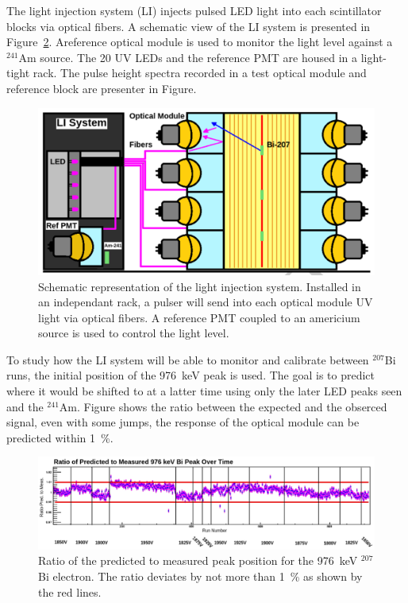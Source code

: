 \documentclass[main.tex]{subfiles}
\begin{document}
\bigskip


\NI The light injection system (LI) injects pulsed LED light into each scintillator blocks via optical fibers. A schematic view of the LI system is presented in Figure~\ref{LIschema}. Areference optical module is used to monitor the light level against a $^{\text{241}}$Am source. The 20 UV LEDs and the reference PMT are housed in a light-tight rack. The pulse height spectra recorded in a test optical module and reference block are presenter in Figure. 

\bigskip
\begin{figure}[h!]
\begin{center}
\includegraphics[scale=0.3]{pictures/Chap3/LIschema.png}
\caption{Schematic representation of the light injection system. Installed in an independant rack, a pulser will send into each optical module UV light via optical fibers. A reference PMT coupled to an americium source is used to control the light level.}
\label{LIschema}
\end{center}
\end{figure}


\NI To study how the LI system will be able to monitor and calibrate between $^{\text{207}}$Bi runs, the initial position of the 976~keV peak is used. The goal is to predict where it would be shifted to at a latter time using only the later LED peaks seen and the $^{\text{241}}$Am. Figure shows the ratio between the expected and the obserced signal, even with some jumps, the response of the optical module can be predicted within 1~\%.

\bigskip
\begin{figure}[h!]
\begin{center}
\includegraphics[scale=0.25]{pictures/Chap3/RatioPredictionLI.png}
\caption{Ratio of the predicted to measured peak position for the 976~keV $^{\text{207}}$Bi electron. The ratio deviates by not more than 1~\% as shown by the red lines.}
\label{LIschema}
\end{center}
\end{figure}
\end{document}
